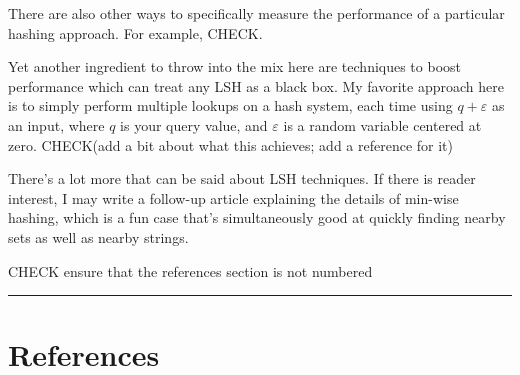 \documentclass[20pt,]{extarticle}
\begin{document}
There are also other ways to specifically measure the performance of a
particular hashing approach. For example, CHECK.

Yet another ingredient to throw into the mix here are techniques to
boost performance which can treat any LSH as a black box. My favorite
approach here is to simply perform multiple lookups on a hash system,
each time using \(q + \varepsilon\) as an input, where \(q\) is your
query value, and \(\varepsilon\) is a random variable centered at zero.
CHECK(add a bit about what this achieves; add a reference for it)

There's a lot more that can be said about LSH techniques. If there is
reader interest, I may write a follow-up article explaining the details
of min-wise hashing, which is a fun case that's simultaneously good at
quickly finding nearby sets as well as nearby strings.

CHECK ensure that the references section is not numbered

\begin{center}\rule{0.5\linewidth}{\linethickness}\end{center}

\section{References}\label{references}
\end{document}
